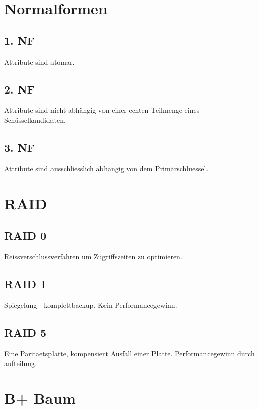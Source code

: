 \documentclass[10pt,a4paper,oneside]{report}
\begin{document}
\section*{Normalformen}

\subsection*{1. NF}

Attribute sind atomar.

\subsection*{2. NF}

Attribute sind nicht abhängig von einer echten Teilmenge eines Schüsselkandidaten.

\subsection*{3. NF}

Attribute sind ausschliesslich abhängig von dem Primärschluessel.

\section*{RAID}

\subsection*{RAID 0}

Reissverschlussverfahren um Zugriffszeiten zu optimieren.

\subsection*{RAID 1}

Spiegelung - komplettbackup. Kein Performancegewinn.

\subsection*{RAID 5}

Eine Paritaetsplatte, kompensiert Ausfall einer Platte. Performancegewinn durch aufteilung.

\section*{B+ Baum}
\end{document}
